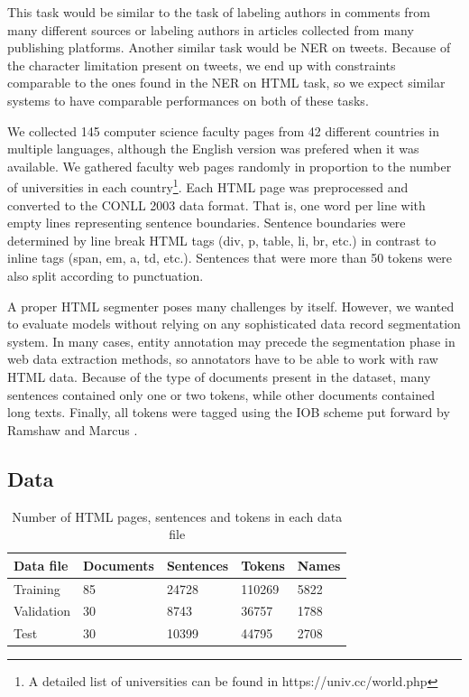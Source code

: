 \documentclass[sigconf]{acmart}
\begin{document}
This task would be similar to the task of labeling authors in comments
from many different sources or labeling authors in articles collected from many
publishing platforms. Another similar task would be NER on tweets. Because of the character
limitation present on tweets, we end up with constraints comparable to the ones
found in the NER on HTML task, so we expect similar systems to have comparable performances
on both of these tasks.

We collected 145 computer science faculty pages from 42 different countries in
multiple languages, although the English version was prefered when it was available.
We gathered faculty web pages randomly in proportion to
the number of universities in each country\footnote{A detailed list of universities can
be found in https://univ.cc/world.php}. Each HTML page was preprocessed and converted
to the CONLL 2003 data format. That is, one word per line with empty lines representing
sentence boundaries. Sentence boundaries were determined by line break HTML tags
(div, p, table, li, br, etc.) in contrast to inline tags (span, em, a, td, etc.). 
Sentences that were more than 50 tokens were also split according to punctuation.

A proper HTML segmenter poses many challenges by itself.
However, we wanted to evaluate models without relying on any sophisticated data record
segmentation system. In many cases, entity annotation may precede the segmentation
phase in web data extraction methods, so annotators have to be able to work with
raw HTML data. Because of the type of documents present in the dataset, many sentences 
contained only one or two tokens, while other documents contained long texts.
Finally, all tokens were tagged using the IOB scheme put forward by
Ramshaw and Marcus \cite{Ramshaw1999}. 

\subsection{Data}

\begin{table}[h]
  \small
  \begin{center}
    \begin{tabular}{ lllll }
      \toprule
      Data file & Documents & Sentences & Tokens & Names \\
      \midrule
      Training    & 85 & 24728 & 110269 & 5822 \\  
      Validation  & 30 & 8743  & 36757  & 1788 \\
      Test        & 30 & 10399 & 44795  & 2708 \\
      \bottomrule
    \end{tabular}
  \end{center}
  \caption{Number of HTML pages, sentences and tokens in each data file}
  \label{tab:dataset}
\end{table}
\end{document}
